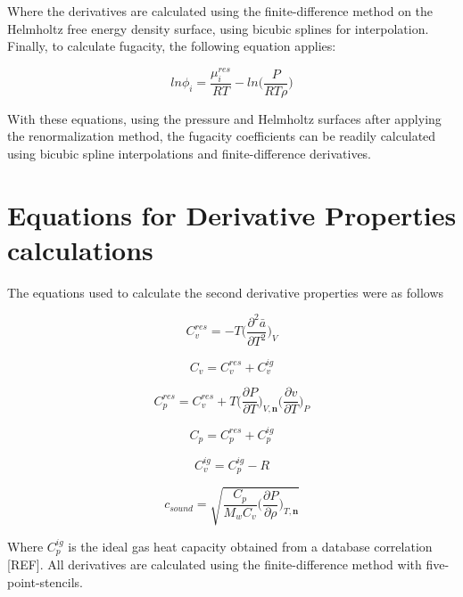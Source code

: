 \documentclass[preprint,12pt,3p]{elsarticle}
\begin{document}
\begin{appendices}
	Where the derivatives are calculated using the finite-difference method on the Helmholtz free energy density surface, using bicubic splines for interpolation. Finally, to calculate fugacity, the following equation applies:

\begin{equation} \label{eq:fugacity}
	ln\phi_{i} = \frac{\mu_{i}^{res}}{RT} - ln\Bigg(\frac{P}{RT\rho}\Bigg)
\end{equation}

	With these equations, using the pressure and Helmholtz surfaces after applying the renormalization method, the fugacity coefficients can be readily calculated using bicubic spline interpolations and finite-difference derivatives.	

\setcounter{equation}{0}
\section{Equations for Derivative Properties calculations}

	The equations used to calculate the second derivative properties were as follows

\begin{equation} \label{eq:Cvres_deriv}
	C_{v}^{res} = -T\Bigg(\frac{\partial^{2}\bar{a}}{\partial T^{2}}\Bigg)_{V}
\end{equation}

\begin{equation} \label{eq:Cv_deriv}
	C_{v} = C_{v}^{res} + C_{v}^{ig}
\end{equation}

\begin{equation} \label{eq:Cpres_deriv}
	C_{p}^{res} = C_{v}^{res} + T \Bigg(\frac{\partial P}{\partial T}\Bigg)_{V,\textbf{n}} \Bigg(\frac{\partial v}{\partial T}\Bigg)_{P}
\end{equation}

\begin{equation} \label{eq:Cp_deriv}
	C_{p} = C_{p}^{res} + C_{p}^{ig}
\end{equation}

\begin{equation} \label{eq:Cvig_deriv}
	C_{v}^{ig} = C_{p}^{ig} - R
\end{equation}

\begin{equation} \label{eq:u_deriv}
	c_{sound} = \sqrt{\frac{C_{p}}{M_{w} C_{v}}\Bigg(\frac{\partial P}{\partial \rho}\Bigg)_{T,\textbf{n}}}
\end{equation}

	Where $C_{p}^{ig}$ is the ideal gas heat capacity obtained from a database correlation [REF]. All derivatives are calculated using the finite-difference method with five-point-stencils.

\end{appendices}

%

\nocite{*}

\section*{\refname}


\end{document}

